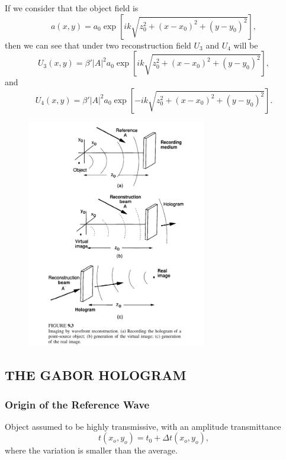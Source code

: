 \documentclass[en,hazy,device=normal,blue,14pt]{elegantnote}
\begin{document}
\begin{example}
  If we consider that the object field is 
  \begin{equation}
    a\left( {x,y} \right) = {a_0}\exp \left[ {ik\sqrt {z_0^2 + {{\left( {x - {x_0}} \right)}^2} + {{\left( {y - {y_0}} \right)}^2}} } \right],
  \end{equation}
  then we can see that under two reconstruction field $U_3$ and $U_4$ will be
  \begin{equation}
    U_3\left(x,y\right)=\beta'\left|A\right|^2{a_0}\exp \left[ {ik\sqrt {z_0^2 + {{\left( {x - {x_0}} \right)}^2} + {{\left( {y - {y_0}} \right)}^2}} } \right],
  \end{equation}
  and
  \begin{equation}
    {U_4}\left( {x,y} \right) = \beta '{\left| A \right|^2}{a_0}\exp \left[ {-ik\sqrt {z_0^2 + {{\left( {x - {x_0}} \right)}^2} + {{\left( {y - {y_0}} \right)}^2}} } \right].
  \end{equation}
\end{example}
\begin{figure}[htbp]
  \centering
  \includegraphics[width=0.7\textwidth]{3.png}
\end{figure}

\subsection{THE GABOR HOLOGRAM}
\subsubsection{Origin of the Reference Wave}
Object assumed to be highly transmissive, with an amplitude transmittance
\begin{equation}
  t\left( {{x_o},{y_o}} \right) = {t_0} + \Delta t\left( {{x_o},{y_o}} \right),
\end{equation}
where the variation is smaller than the average.
\end{document}
